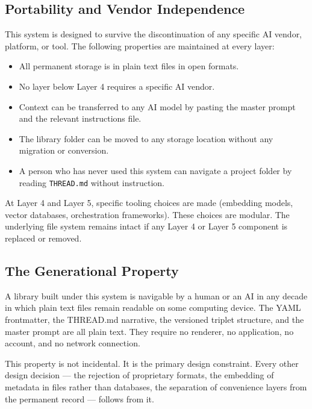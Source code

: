 \documentclass[12pt,letterpaper]{article}
\begin{document}
\subsection{Portability and Vendor Independence}

This system is designed to survive the discontinuation of any specific
AI vendor, platform, or tool. The following properties are maintained
at every layer:

\begin{itemize}
  \item All permanent storage is in plain text files in open formats.
  \item No layer below Layer 4 requires a specific AI vendor.
  \item Context can be transferred to any AI model by pasting the
        master prompt and the relevant instructions file.
  \item The library folder can be moved to any storage location
        without any migration or conversion.
  \item A person who has never used this system can navigate a project
        folder by reading \texttt{THREAD.md} without instruction.
\end{itemize}

At Layer 4 and Layer 5, specific tooling choices are made
(embedding models, vector databases, orchestration frameworks).
These choices are modular. The underlying file system remains intact
if any Layer 4 or Layer 5 component is replaced or removed.

\subsection{The Generational Property}

A library built under this system is navigable by a human or an AI in
any decade in which plain text files remain readable on some computing
device. The YAML frontmatter, the THREAD.md narrative, the versioned
triplet structure, and the master prompt are all plain text. They require
no renderer, no application, no account, and no network connection.

This property is not incidental. It is the primary design constraint.
Every other design decision --- the rejection of proprietary formats,
the embedding of metadata in files rather than databases, the separation
of convenience layers from the permanent record --- follows from it.

\end{document}

